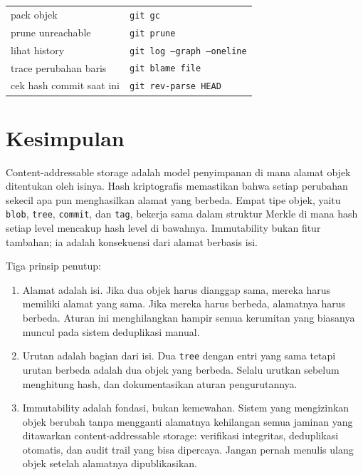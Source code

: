 \documentclass[11pt,a4paper]{article}
\begin{document}
\begin{table}[H]
\begin{tabularx}{\textwidth}{l X}
		pack objek                              & \texttt{git gc}                                  \\
		prune unreachable                       & \texttt{git prune}                               \\
		lihat history                           & \texttt{git log --graph --oneline}               \\
		trace perubahan baris                   & \texttt{git blame file}                          \\
		cek hash commit saat ini                & \texttt{git rev-parse HEAD}                      \\
		\bottomrule
	\end{tabularx}
\end{table}

\section{Kesimpulan}

Content-addressable storage adalah model penyimpanan di mana alamat objek ditentukan oleh isinya. Hash kriptografis memastikan bahwa setiap perubahan sekecil apa pun menghasilkan alamat yang berbeda. Empat tipe objek, yaitu \texttt{blob}, \texttt{tree}, \texttt{commit}, dan \texttt{tag}, bekerja sama dalam struktur Merkle di mana hash setiap level mencakup hash level di bawahnya. Immutability bukan fitur tambahan; ia adalah konsekuensi dari alamat berbasis isi.

Tiga prinsip penutup:

\begin{enumerate}
	\item Alamat adalah isi. Jika dua objek harus dianggap sama, mereka harus memiliki alamat yang sama. Jika mereka harus berbeda, alamatnya harus berbeda. Aturan ini menghilangkan hampir semua kerumitan yang biasanya muncul pada sistem deduplikasi manual.
	\item Urutan adalah bagian dari isi. Dua \texttt{tree} dengan entri yang sama tetapi urutan berbeda adalah dua objek yang berbeda. Selalu urutkan sebelum menghitung hash, dan dokumentasikan aturan pengurutannya.
	\item Immutability adalah fondasi, bukan kemewahan. Sistem yang mengizinkan objek berubah tanpa mengganti alamatnya kehilangan semua jaminan yang ditawarkan content-addressable storage: verifikasi integritas, deduplikasi otomatis, dan audit trail yang bisa dipercaya. Jangan pernah menulis ulang objek setelah alamatnya dipublikasikan.
\end{enumerate}
\end{document}
